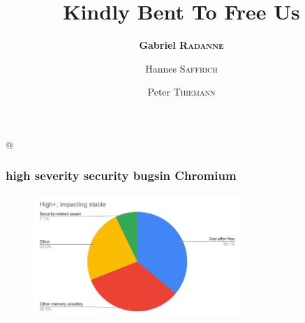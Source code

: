 \documentclass[aspectratio=169,dvipsnames,svgnames,10pt]{beamer}
\title{Kindly Bent To Free Us}
\author{\textbf{Gabriel \textsc{Radanne}}
  \and Hannes \textsc{Saffrich}
  \and Peter \textsc{Thiemann}}
\date{}
\begin{document}
\lstMakeShortInline[keepspaces,basicstyle=\small\ttfamily]@

\frame[plain]{\titlepage}


\begin{frame}
  \frametitle{\og high severity security bugs\fg in Chromium}

  \begin{figure}[h]
    \centering
    \includegraphics[width=0.7\textwidth]
    {chromium-use-after-free}
  \end{figure}

\end{frame}
\end{document}
